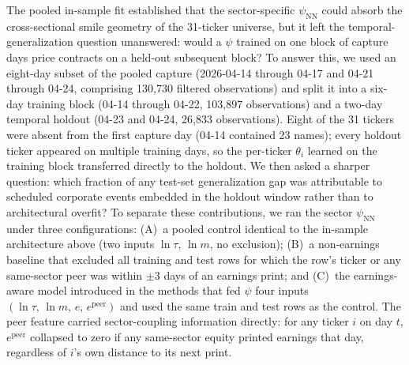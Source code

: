 The pooled in-sample fit established that the sector-specific $\psi_{\text{NN}}$ could absorb the cross-sectional smile geometry of the 31-ticker universe, but it left the temporal-generalization question unanswered: would a $\psi$ trained on one block of capture days price contracts on a held-out subsequent block? To answer this, we used an eight-day subset of the pooled capture (2026-04-14 through 04-17 and 04-21 through 04-24, comprising 130{,}730 filtered observations) and split it into a six-day training block (04-14 through 04-22, 103{,}897 observations) and a two-day temporal holdout (04-23 and 04-24, 26{,}833 observations). Eight of the 31 tickers were absent from the first capture day (04-14 contained 23 names); every holdout ticker appeared on multiple training days, so the per-ticker $\theta_i$ learned on the training block transferred directly to the holdout. We then asked a sharper question: which fraction of any test-set generalization gap was attributable to scheduled corporate events embedded in the holdout window rather than to architectural overfit? To separate these contributions, we ran the sector $\psi_{\text{NN}}$ under three configurations: (A)~a pooled control identical to the in-sample architecture above (two inputs $\ln\tau,\,\ln m$, no exclusion); (B)~a non-earnings baseline that excluded all training and test rows for which the row's ticker or any same-sector peer was within $\pm 3$ days of an earnings print; and (C)~the earnings-aware model introduced in the methods that fed $\psi$ four inputs $(\ln\tau,\,\ln m,\,e,\,e^{\text{peer}})$ and used the same train and test rows as the control. The peer feature carried sector-coupling information directly: for any ticker $i$ on day $t$, $e^{\text{peer}}$ collapsed to zero if any same-sector equity printed earnings that day, regardless of $i$'s own distance to its next print.

